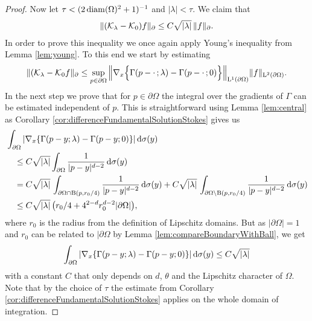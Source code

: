 \begin{proof}
  Now let $\tau < (2 \operatorname{diam}(\Omega)^2 + 1)^{-1}$ and $|\lambda| < \tau$.
  We claim that
  \begin{align*}
    \| (\mathcal{K}_\lambda - \mathcal{K}_0) f\|_\partial \leq C \sqrt{|\lambda|}\, \|f\|_\partial.
  \end{align*}
  In order to prove this inequality we once again apply Young's inequality from Lemma \ref{lem:young}. To this end we start by estimating
  \begin{align*}
    \| (\mathcal{K}_\lambda - \mathcal{K}_0 f\|_\partial 
    \leq \sup_{p \in \partial\Omega} \Big\| \nabla_x \Big\{ \Gamma(p - \cdot\,; \lambda) - \Gamma(p - \cdot\,; 0) \Big\} \Big\|_{\mathrm{L}^1(\partial\Omega)} \| f\|_{\mathrm{L}^2(\partial\Omega)}.
  \end{align*}
  In the next step we prove that for $p \in \partial\Omega$ the integral over the gradients of $\Gamma$ can be estimated independent of $p$.
  This is straightforward using Lemma \ref{lem:central} as Corollary \ref{cor:differenceFundamentalSolutionStokes} gives us
  \begin{align*}
    &\int_{\partial\Omega} | \nabla_x \{ \Gamma(p - y; \lambda) - \Gamma(p - y; 0) \} | \, {\operatorname{d}\!{\sigma}}(y)\\
    &\quad\leq C \sqrt{|\lambda|} \int_{\partial\Omega} \frac{1}{|p - y|^{d - 2}} \, {\operatorname{d}\!{\sigma}}(y) \\
    &\quad= C \sqrt{|\lambda|}\, \int_{\partial\Omega \cap \mathrm{B}(p, r_0/4)} \frac{1}{|p - y|^{d - 2}} \, {\operatorname{d}\!{\sigma}}(y) + C \sqrt{|\lambda|}\, \int_{\partial\Omega \setminus \mathrm{B}(p, r_0/4)} \frac{1}{|p - y|^{d - 2}} \, {\operatorname{d}\!{\sigma}}(y) \\
    &\quad\leq C \sqrt{|\lambda|} \,\big( r_0/4 + 4^{2 - d} r_0^{d - 2} |\partial\Omega| \big),
  \end{align*}
  where $r_0$ is the radius from the definition of Lipschitz domains.
  But as $|\partial\Omega| = 1$ and $r_0$ can be related to $|\partial\Omega$ by Lemma \ref{lem:compareBoundaryWithBall}, we get
  \begin{align*}
    \int_{\partial\Omega} |\nabla_x \{\Gamma(p - y; \lambda) - \Gamma(p - y; 0) \} | \, {\operatorname{d}\!{\sigma}}(y) \leq C \sqrt{|\lambda|}
  \end{align*}
  with a constant $C$ that only depends on $d$, $\theta$ and the Lipschitz character of $\Omega$.
  Note that by the choice of $\tau$ the estimate from Corollary \ref{cor:differenceFundamentalSolutionStokes} applies on the whole domain of integration.


\end{proof}

